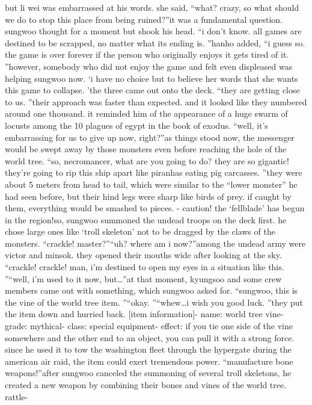 but li wei was embarrassed at his words.
she said, “what? crazy, so what should we do to stop this place from being ruined?”it was a fundamental question.
 sungwoo thought for a moment but shook his head.
“i don’t know.
 all games are destined to be scrapped, no matter what its ending is.
”hanho added, “i guess so.
 the game is over forever if the person who originally enjoys it gets tired of it.
”however, somebody who did not enjoy the game and felt even displeased was helping sungwoo now.
‘i have no choice but to believe her words that she wants this game to collapse.
’the three came out onto the deck.
“they are getting close to us.
”their approach was faster than expected.
 and it looked like they numbered around one thousand.
it reminded him of the appearance of a huge swarm of locusts among the 10 plagues of egypt in the book of exodus.
“well, it’s embarrassing for us to give up now, right?”as things stood now, the messenger would be swept away by those monsters even before reaching the hole of the world tree.
“so, necromancer, what are you going to do? they are so gigantic! they’re going to rip this ship apart like piranhas eating pig carcasses.
”they were about 5 meters from head to tail, which were similar to the “lower monster” he had seen before, but their hind legs were sharp like birds of prey.
 if caught by them, everything would be smashed to pieces.
- caution! the ‘fellblade’ has begun in the region!so, sungwoo summoned the undead troops on the deck first.
 he chose large ones like ‘troll skeleton’ not to be dragged by the claws of the monsters.
“crackle! master?”“uh? where am i now?”among the undead army were victor and minsok.
 they opened their mouths wide after looking at the sky.
“crackle! crackle! man, i’m destined to open my eyes in a situation like this.
”“well, i’m used to it now, but…”at that moment, kyungsoo and some crew members came out with something, which sungwoo asked for.
“sungwoo, this is the vine of the world tree item.
”“okay.
”“whew…i wish you good luck.
”they put the item down and hurried back.
[item information]- name: world tree vine- grade: mythical- class: special equipment- effect: if you tie one side of the vine somewhere and the other end to an object, you can pull it with a strong force.
since he used it to tow the washington fleet through the hypergate during the american air raid, the item could exert tremendous power.
“manufacture bone weapons!”after sungwoo canceled the summoning of several troll skeletons, he created a new weapon by combining their bones and vines of the world tree.
rattle-

